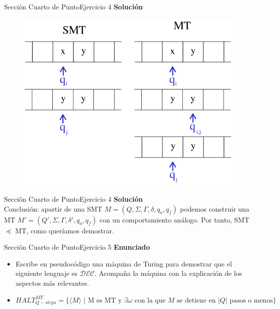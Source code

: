 \documentclass[10pt, envcountsect, presentation, aspectratio=169]{beamer}
\newcommand{\ld}{\ensuremath{\mathcal {DEC}}}
\begin{document}
\begin{frame}{Sección Cuarto de Punto}{Ejercicio 4}
    \textbf{Solución}\\
    \begin{figure}
        \includegraphics[scale=0.25]{images/mct1ej4_3.png}
    \end{figure}
\end{frame}


\begin{frame}{Sección Cuarto de Punto}{Ejercicio 4}
    \textbf{Solución}\\
    Conclusión: apartir de una SMT $M=(Q,\Sigma,\Gamma,\delta,q_o,q_f)$ podemos construir una MT $M'=(Q',\Sigma,\Gamma,\delta',q_o,q_f)$ con un comportamiento análogo.
    Por tanto, SMT $\preceq$ MT, como queríamos demostrar.
\end{frame}


\begin{frame}{Sección Cuarto de Punto}{Ejercicio 5}
\textbf{Enunciado}
	\begin{itemize}
        \item Escribe en pseudocódigo una máquina de Turing para demostrar que el siguiente lenguaje es $\ld$. Acompaña la máquina con la explicación de los aspectos más relevantes. 
        \item[] $$HALT_{Q-steps}^{MT}=\{\langle M \rangle \mbox{ | M es MT y } \exists \omega \mbox{ con la que } M \mbox{ se detiene en }|Q| \mbox{ pasos o menos}  \}$$
    \end{itemize}
\end{frame}
\end{document}
